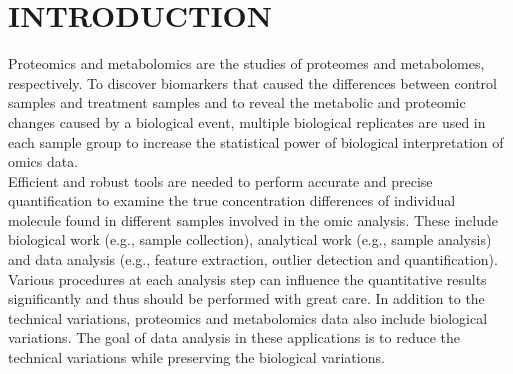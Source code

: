 \chapter{INTRODUCTION}
Proteomics and metabolomics are the studies of proteomes and metabolomes, respectively. To discover biomarkers that caused the differences between control samples and treatment samples and to reveal the metabolic and proteomic changes caused by a biological event, multiple biological replicates are used in each sample group to increase the statistical power of biological interpretation of omics data.\\
\indent Efficient and robust tools are needed to perform accurate and precise quantification to examine the true concentration differences of individual molecule found in different samples involved in the omic analysis. These include biological work (e.g., sample collection), analytical work
(e.g., sample analysis) and data analysis (e.g., feature extraction, outlier detection and quantification). Various procedures at each analysis step can influence the quantitative results significantly and thus should be performed with great care. In addition to the technical variations, proteomics and metabolomics data also include biological variations. The goal of data analysis in these applications is to reduce the technical variations while preserving the biological variations. 

